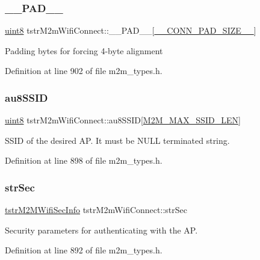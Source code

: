 \subsubsection{\texorpdfstring{\+\_\+\+\_\+\+P\+A\+D\+\_\+\+\_\+}{\_\_PAD\_\_}}
{\footnotesize\ttfamily \hyperlink{group__DataT_ga4df709a77647e870bbf1d955b8edc9a6}{uint8} tstr\+M2m\+Wifi\+Connect\+::\+\_\+\+\_\+\+P\+A\+D\+\_\+\+\_\+\mbox{[}\hyperlink{m2m__types_8h_a2970aac9a0bb2054caba2b80a8f04dd4}{\+\_\+\+\_\+\+C\+O\+N\+N\+\_\+\+P\+A\+D\+\_\+\+S\+I\+Z\+E\+\_\+\+\_\+}\mbox{]}}

Padding bytes for forcing 4-\/byte alignment 

Definition at line 902 of file m2m\+\_\+types.\+h.

\mbox{\label{structtstrM2mWifiConnect_a74af255fcf9e3f7db52ccd308359e7d3}} 
\subsubsection{\texorpdfstring{au8\+S\+S\+ID}{au8SSID}}
{\footnotesize\ttfamily \hyperlink{group__DataT_ga4df709a77647e870bbf1d955b8edc9a6}{uint8} tstr\+M2m\+Wifi\+Connect\+::au8\+S\+S\+ID\mbox{[}\hyperlink{group__WlanDefines_gab2bd95c18ede2fbc07b44c5660cc0097}{M2\+M\+\_\+\+M\+A\+X\+\_\+\+S\+S\+I\+D\+\_\+\+L\+EN}\mbox{]}}

S\+S\+ID of the desired AP. It must be N\+U\+LL terminated string. 

Definition at line 898 of file m2m\+\_\+types.\+h.

\mbox{\label{structtstrM2mWifiConnect_a2fa396b7a30634994c27eeda397bbfde}} 
\subsubsection{\texorpdfstring{str\+Sec}{strSec}}
{\footnotesize\ttfamily \hyperlink{structtstrM2MWifiSecInfo}{tstr\+M2\+M\+Wifi\+Sec\+Info} tstr\+M2m\+Wifi\+Connect\+::str\+Sec}

Security parameters for authenticating with the AP. 

Definition at line 892 of file m2m\+\_\+types.\+h.

